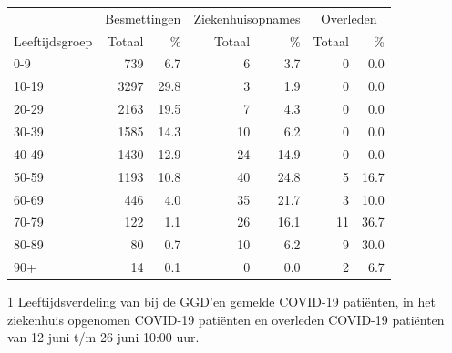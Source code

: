\documentclass[
  english,
  man,floatsintext]{apa6}
\begin{document}
\begin{table}
\centering\begingroup\fontsize{11}{13}\selectfont

\begin{threeparttable}
\begin{tabular}{lrrrrrr}
\toprule
\multicolumn{1}{c}{ } & \multicolumn{2}{c}{Besmettingen} & \multicolumn{2}{c}{Ziekenhuisopnames} & \multicolumn{2}{c}{Overleden} \\
\cmidrule(l{3pt}r{3pt}){2-3} \cmidrule(l{3pt}r{3pt}){4-5} \cmidrule(l{3pt}r{3pt}){6-7}
Leeftijdsgroep & Totaal & \% & Totaal & \% & Totaal & \%\\
\midrule
0-9 & 739 & 6.7 & 6 & 3.7 & 0 & 0.0\\
10-19 & 3297 & 29.8 & 3 & 1.9 & 0 & 0.0\\
20-29 & 2163 & 19.5 & 7 & 4.3 & 0 & 0.0\\
30-39 & 1585 & 14.3 & 10 & 6.2 & 0 & 0.0\\
40-49 & 1430 & 12.9 & 24 & 14.9 & 0 & 0.0\\
50-59 & 1193 & 10.8 & 40 & 24.8 & 5 & 16.7\\
60-69 & 446 & 4.0 & 35 & 21.7 & 3 & 10.0\\
70-79 & 122 & 1.1 & 26 & 16.1 & 11 & 36.7\\
80-89 & 80 & 0.7 & 10 & 6.2 & 9 & 30.0\\
90+ & 14 & 0.1 & 0 & 0.0 & 2 & 6.7\\
\bottomrule
\end{tabular}
\begin{tablenotes}
\item[1] Leeftijdsverdeling van bij de GGD’en gemelde COVID-19 patiënten, in het ziekenhuis opgenomen COVID-19 patiënten en overleden COVID-19 patiënten van 12 juni t/m 26 juni 10:00 uur.
\end{tablenotes}
\end{threeparttable}
\endgroup{}
\end{table}

\newpage
\end{document}
